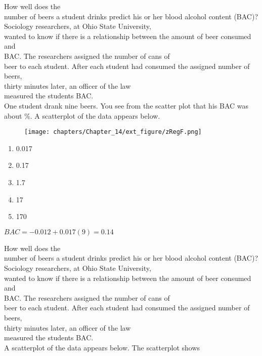 \documentclass[11pt]{book}\usepackage[]{graphicx}\usepackage[]{color}
\begin{document}
\begin{exercises}
\begin{exercise}
    How well does the \\ number of beers a student drinks predict his or her
blood alcohol content (BAC)? Sociology researchers, at Ohio State University, \\ wanted to know if there is a relationship between the amount of beer consumed and \\ BAC. The researchers assigned the number of cans of \\ beer to each student. After each student had consumed the assigned number of beers,  \\ thirty minutes later, an officer of the law \\ measured the students BAC. \\ \cite{OSU2016}  One  student drank nine beers. You see from the scatter plot that his BAC was about
\%.  A scatterplot of the data appears below.

\begin{figure}[htbp] %
   \centering
   \texttt{[image: chapters/Chapter\_14/ext\_figure/zRegF.png]}
   
   \label{fig:f12_11}
\end{figure}

    \begin{enumerate}
    \item 0.017
    \item 0.17
    \item 1.7
    \item 17
    \item 170
    \end{enumerate}
    

  \end{exercise}
  \begin{solution}    %
  
     $ BAC = -0.012 + 0.017 (9) = 0.14 $
     
  \end{solution}

  \begin{exercise} %

    How well does the \\ number of beers a student drinks predict his or her
blood alcohol content (BAC)? Sociology researchers, at Ohio State University, \\ wanted to know if there is a relationship between the amount of beer consumed and \\ BAC. The researchers assigned the number of cans of \\ beer to each student. After each student had consumed the assigned number of beers,  \\ thirty minutes later, an officer of the law \\ measured the students BAC. \\ \cite{OSU2016}  A scatterplot of the data appears below.  The scatterplot shows


\end{exercise}
\end{exercises}
\end{document}
